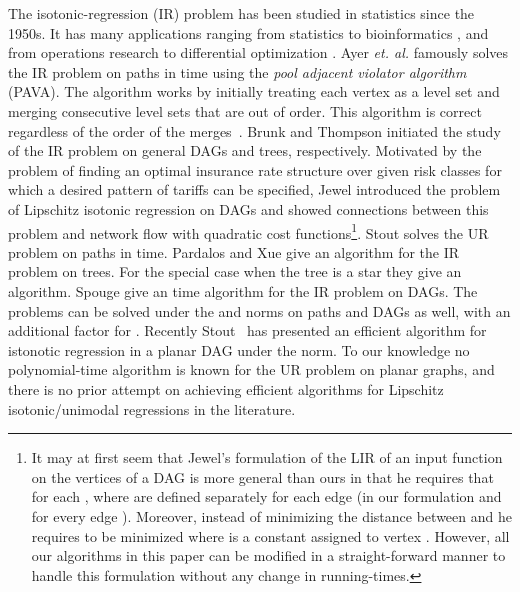 \documentclass[11pt]{article}
\newcommand{\ir}{IR }
\newcommand{\ur}{UR }
\begin{document}
The isotonic-regression (IR)  problem has been studied in 
statistics \cite{ABERS55,BBBB72,Preparata:85} since the 1950s.  It has many applications ranging from 
statistics \cite{Sto00} to bioinformatics \cite{BBBB72}, and from operations 
research \cite{MM85}  to differential optimization \cite{GW84}.  
Ayer \emph{et. al.} \cite{ABERS55} famously solves the \ir problem on 
paths in  time using the 
\emph{pool adjacent violator algorithm} (PAVA).  The algorithm 
works by initially treating each vertex as a level set and merging consecutive level sets that are out of order.  This algorithm is correct regardless of the order of the merges~\cite{RWD88}.  
Brunk \cite{Bru55} and Thompson \cite{Tho62} initiated the study of the \ir problem on general DAGs and trees, respectively.
Motivated by the problem of finding an optimal insurance rate structure over given risk classes for which a desired pattern of tariffs can be specified, Jewel \cite{Jewel:75} introduced the problem of Lipschitz isotonic regression on DAGs and showed connections between this problem and network flow with quadratic cost functions\footnote{It may at first seem that Jewel's formulation of the LIR  of an input function  on the vertices of a DAG is more general than ours in that he requires that for each ,  where  are defined separately for each edge (in our formulation  and  for every edge ). Moreover, instead of minimizing the  distance between  and  he requires  to be minimized where  is a constant assigned to vertex . However,  all our algorithms in this paper can be modified in a straight-forward manner to handle this formulation without any change in running-times.}.
Stout \cite{Sto08} solves the \ur problem on paths in  time.
Pardalos and Xue \cite{PX99} give an  algorithm for the \ir problem on trees.  
For the special case when the tree is a star they give an  algorithm.  
Spouge \etal \cite{SWW03} give an  time algorithm for the \ir problem on DAGs.  
The problems can be solved under the  and  norms on 
paths \cite{Sto08} and DAGs \cite{AHKW06} as well, with an 
additional  factor for . Recently Stout~\cite{Stout:08} has
presented an efficient algorithm for istonotic regression in a planar
DAG under the  norm. To our knowledge no polynomial-time algorithm is known for the 
UR problem on planar graphs, and there is no prior attempt on achieving efficient algorithms for  
Lipschitz isotonic/unimodal regressions in the literature. 
\end{document}
